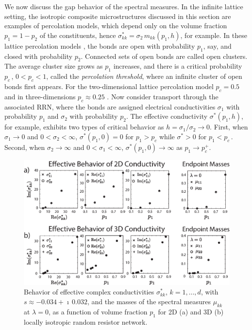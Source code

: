 \documentclass{cmslatex}
\begin{document}
We now discuss the gap behavior of the spectral measures. In the
infinite lattice setting, the isotropic composite 
microstructures discussed in this section are examples of percolation
models, which depend only on the volume fraction $p_1=1-p_2$ of the
constituents, hence $\sigma^*_{kk}=\sigma_2\,m_{kk}(p_1,h)$, for example. In these lattice
percolation models \cite{Stauffer-92,Torquato:RHM-02}, the bonds are 
open with probability $p_1$, say, and closed with probability
$p_2$. Connected sets of open bonds are called open clusters. The
average cluster size grows as $p_1$ increases, and there is a critical
probability $p_c\,$, $0<p_c<1$, called the \emph{percolation
  threshold}, where an infinite cluster of open bonds first
appears. For the two-dimensional lattice percolation model $p_c=0.5$
and in three-dimensions $p_c\approx0.25$ 
\cite{Stauffer-92,Torquato:RHM-02}. Now consider transport through the
associated RRN, where the bonds are assigned electrical conductivities
$\sigma_1$ with probability $p_1$ and $\sigma_2$ with probability $p_2$. The
effective conductivity $\sigma^*(p_1,h)$, for example, exhibits two types
of critical behavior as $h=\sigma_1/\sigma_2\to0$. First, when $\sigma_1\to0$ and
$0<\sigma_2<\infty$, $\sigma^*(p_1,0)=0$ for $p_1>p_c$ while $\sigma^*>0$ for $p_1<p_c\,$.
Second, when $\sigma_2\to\infty$ and $0<\sigma_1<\infty$, $\sigma^*(p_1,0) \to \infty$ as $p_1\to p_c^+$.


%
\begin{figure}[t]
  \centerline{\includegraphics[scale=0.68]{Effective_Parameter_Behavior_4_75GHz.eps}} 
\caption{Behavior of effective complex conductivities $\sigma^*_{kk}$,
  $k=1,\ldots,d$, with $s\approx-0.034+\imath\,0.032$, and the masses of the spectral
  measures $\mu_{kk}$ at $\lambda=0$, as a function of volume fraction $p_1$
  for 2D (a) and 3D (b) locally isotropic random resistor network.   
        }
\label{fig:Effective_Parameter_Behavior}
\end{figure}
%
\end{document}
